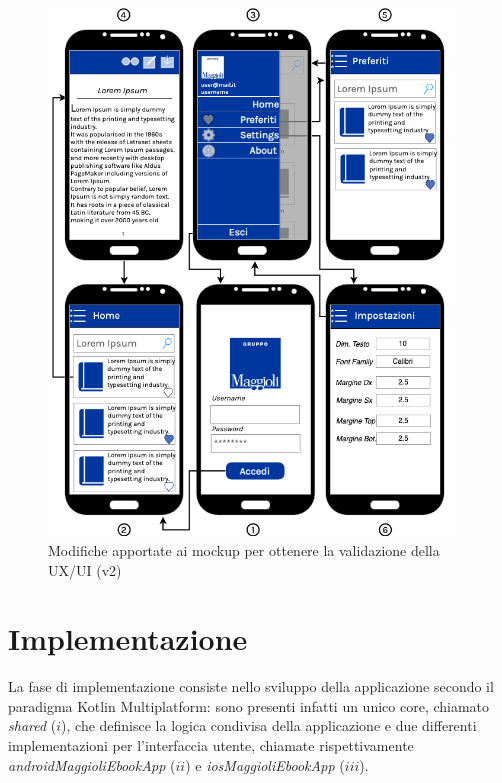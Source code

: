 \begin{figure}[H]
\centering
\includegraphics[width=0.95\textwidth]{img/tesi-23-mockupv2.drawio.png}
\caption{Modifiche apportate ai mockup per ottenere la validazione della UX/UI (v2)}
\end{figure}

\section{Implementazione}
La fase di implementazione consiste nello sviluppo della applicazione secondo il paradigma Kotlin Multiplatform: sono presenti infatti un unico core, chiamato \textit{shared} ($i$), che definisce la logica condivisa della applicazione e due differenti implementazioni per l'interfaccia utente, chiamate rispettivamente \textit{androidMaggioliEbookApp} ($ii$) e \textit{iosMaggioliEbookApp} ($iii$).

